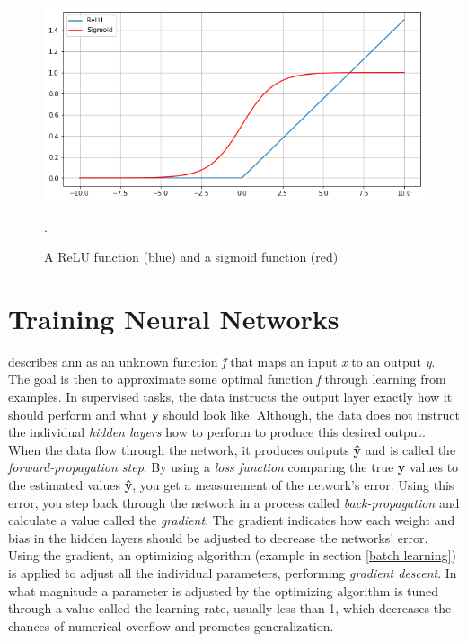             \begin{figure}[H]
                \centering
                \includegraphics[scale=0.5]{figures/activation.png}
                \caption[ReLu and sigmoid]{A ReLU function (blue) and a sigmoid function (red)}.
              	\medskip 
                \label{activation_fig}
            \end{figure}

\section{Training Neural Networks} \label{training neural networks}
    \citeauthor{Goodfellow-et-al-2016_NN}\cite{Goodfellow-et-al-2016_NN} describes \gls{ann} as an unknown function \textit{\^{f}} that maps an input \textit{x} to an output \textit{y}. The goal is then to approximate some optimal function \textit{f} through learning from examples. In supervised tasks, the data instructs the output layer exactly how it should perform and what \textbf{y} should look like. Although, the data does not instruct the individual \textit{hidden layers} how to perform to produce this desired output. When the data flow through the network, it produces outputs \textbf{\^{y}} and is called the \textit{forward-propagation step}. By using a \textit{loss function} comparing the true \textbf{y} values to the estimated values \textbf{\^{y}}, you get a measurement of the network's error. Using this error, you step back through the network in a process called \textit{back-propagation} and calculate a value called the \textit{gradient}. The gradient indicates how each weight and bias in the hidden layers should be adjusted to decrease the networks' error. Using the gradient, an optimizing algorithm (example in section \ref{batch learning}) is applied to adjust all the individual parameters, performing \textit{gradient descent}\cite{Goodfellow-et-al-2016_gradient_descent}. In what magnitude a parameter is adjusted by the optimizing algorithm is tuned through a value called the learning rate, usually less than 1, which decreases the chances of numerical overflow\cite{Goodfellow-et-al-2016_learning_rate} and promotes generalization\cite{wilson2001need_learning_rate}.
    
